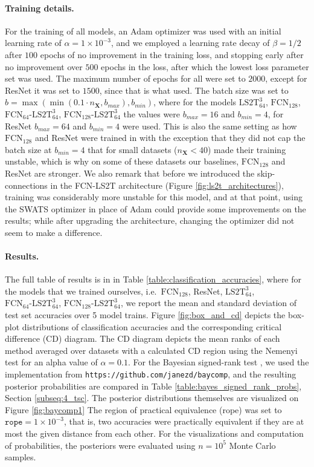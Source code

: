 \documentclass{article} \usepackage{iclr2021_conference,times}
\newcommand{\bX}{\mathbf{X}}
\newcommand{\FCN}[1]{\ensuremath{\text{FCN}_{#1}}}
\newcommand{\LStwoTwidth}[2]{\ensuremath{\text{LS2T}_{#1}^{#2}}}
\newcommand{\FCNLStwoTwidth}[3]{\ensuremath{\text{FCN}_{#1}\text{-}\text{LS2T}_{#2}^{#3}}}
\theoremstyle{plain}
\theoremstyle{definition}
\begin{document}
\paragraph{Training details.} For the training of all models, an {\sc Adam} optimizer \citep{Kingma2015AdamAM} was used with an initial learning rate of $\alpha = 1 \times 10^{-3}$, and we employed a learning rate decay of $\beta = 1 / 2$ after $100$ epochs of no improvement in the training loss, and stopping early after no improvement over $500$ epochs in the loss, after which the lowest loss parameter set was used. The maximum number of epochs for all were set to $2000$, except for ResNet it was set to $1500$, since that is what \citet{Fawaz2019DLforTSC} used. The batch size was set to $b = \max(\min(0.1\cdot n_\bX, b_{max}), b_{min})$, where for the models \LStwoTwidth{64}{3}, \FCN{128}, \FCNLStwoTwidth{64}{64}{3}, \FCNLStwoTwidth{128}{64}{3} the values were $b_{max}=16$ and $b_{min}=4$, for ResNet $b_{max}=64$ and $b_{min}=4$ were used. This is also the same setting as how \FCN{128} and ResNet were trained in \citet{Fawaz2019DLforTSC} with the exception that they did not cap the batch size at $b_{min}=4$ that for small datasets ($n_\bX < 40$) made their training unstable, which is why on some of these datasets our baselines, \FCN{128} and ResNet are stronger. We also remark that before we introduced the skip-connections in the FCN-LS2T architecture (Figure \ref{fig:ls2t_architectures}), training was considerably more unstable for this model, and at that point, using the {\sc SWATS} optimizer \citep{keskar2017improving} in place of {\sc Adam} could provide some improvements on the results; while after upgrading the architecture, changing the optimizer did not seem to make a difference.

\paragraph{Results.} The full table of results is in in Table \ref{table:classification_accuracies}, where for the models that we trained ourselves, i.e.~\FCN{128}, ResNet, \LStwoTwidth{64}{3}, \FCNLStwoTwidth{64}{64}{3}, \FCNLStwoTwidth{128}{64}{3}, we report the mean and standard deviation of test set accuracies over 5 model trains. Figure \ref{fig:box_and_cd} depicts the box-plot distributions of classification accuracies and the corresponding critical difference (CD) diagram. The CD diagram depicts the mean ranks of each method averaged over datasets with a calculated CD region using the Nemenyi test \citep{nemenyi1963distribution} for an alpha value of $\alpha=0.1$. For the Bayesian signed-rank test \citep{benavoli2014bayesian}, we used the implementation from \texttt{https://github.com/janezd/baycomp}, and the resulting posterior probabilities are compared in Table \ref{table:bayes_signed_rank_probs}, Section \ref{subseq:4_tsc}. The posterior distributions themselves are visualized on Figure \ref{fig:baycomp1} The region of practical equivalence (rope) was set to $\texttt{rope} = 1 \times 10^{-3}$, that is, two accuracies were practically equivalent if they are at most the given distance from each other. For the visualizations and computation of probabilities, the posteriors were evaluated using $n=10^5$ Monte Carlo samples.
\end{document}
